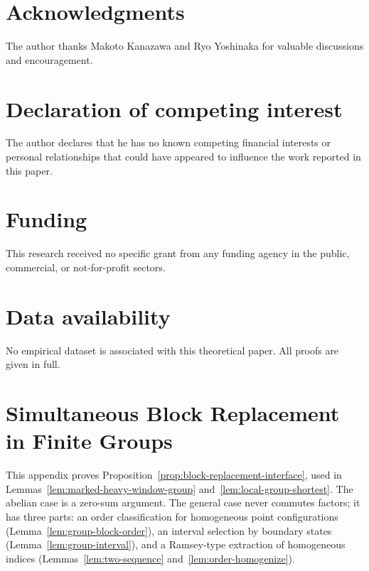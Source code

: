 \documentclass[11pt]{article}
\numberwithin{equation}{section}
\theoremstyle{plain}
\theoremstyle{definition}
\theoremstyle{remark}
\theoremstyle{plain}
\begin{document}
\section*{Acknowledgments}
The author thanks Makoto Kanazawa and Ryo Yoshinaka for valuable discussions
and encouragement.

\section*{Declaration of competing interest}
The author declares that he has no known competing financial interests or
personal relationships that could have appeared to influence the work reported
in this paper.

\section*{Funding}
This research received no specific grant from any funding agency in the public,
commercial, or not-for-profit sectors.

\section*{Data availability}
No empirical dataset is associated with this theoretical paper.  All proofs
are given in full.

\appendix
\section{Simultaneous Block Replacement in Finite Groups}
\label{app:group-blocks}

This appendix proves Proposition~\ref{prop:block-replacement-interface}, used in
Lemmas~\ref{lem:marked-heavy-window-group} and~\ref{lem:local-group-shortest}.
The abelian case is a zero-sum argument.  The general case never commutes
factors; it has three parts: an order classification for homogeneous point
configurations (Lemma~\ref{lem:group-block-order}), an interval selection by
boundary states (Lemma~\ref{lem:group-interval}), and a Ramsey-type extraction of
homogeneous indices (Lemmas~\ref{lem:two-sequence} and~\ref{lem:order-homogenize}).
\end{document}

